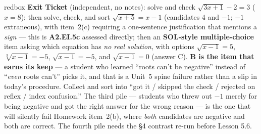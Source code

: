 \documentclass[10pt]{article}
\begin{document}
\begin{skillbox}{redbox}
\textbf{Exit Ticket} (independent, no notes): solve and check $\sqrt{3x+1}-2=3$ ($x=8$); then solve,
check, and sort $\sqrt{x+5}=x-1$ (candidates $4$ and $-1$; $-1$ extraneous), with item~2(c)
requiring a one-sentence justification that mentions a \emph{sign} --- this is
\textbf{A2.EI.5c} assessed directly; then an \textbf{SOL-style multiple-choice} item asking which
equation has \emph{no real solution}, with options $\sqrt{x-1}=5$, $\sqrt[3]{x-1}=-5$,
$\sqrt{x-1}=-5$, and $\sqrt{x-1}=0$ (answer C). \textbf{B is the item that earns its keep} --- a
student who learned ``roots can't be negative'' instead of ``\emph{even} roots can't'' picks it, and
that is a Unit~5 spine failure rather than a slip in today's procedure. Collect and sort into ``got
it / skipped the check / rejected on reflex / index confusion.'' The third pile --- students who
threw out $-1$ merely for being negative and got the right answer for the wrong reason --- is the
one that will silently fail Homework item~2(b), where \emph{both} candidates are negative and both
are correct. The fourth pile needs the \S4 contrast re-run before Lesson 5.6.
\end{skillbox}
\end{document}
